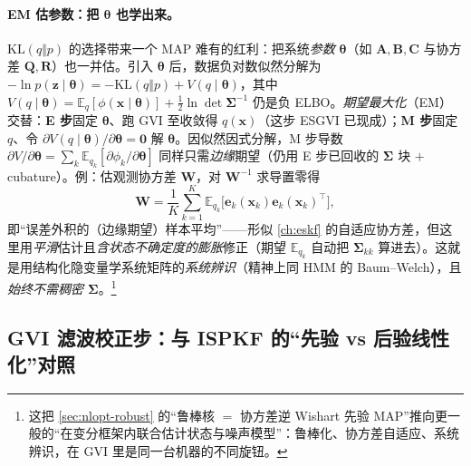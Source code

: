 \paragraph{EM 估参数：把 $\boldsymbol{\theta}$ 也学出来。}
$\mathrm{KL}(q\Vert p)$ 的选择带来一个 MAP 难有的红利：把系统\emph{参数} $\boldsymbol{\theta}$（如 $\mathbf{A},\mathbf{B},\mathbf{C}$ 与协方差 $\mathbf{Q},\mathbf{R}$）也一并估。引入 $\boldsymbol{\theta}$ 后，数据负对数似然分解为 $-\ln p(\mathbf{z}\mid\boldsymbol{\theta})=-\mathrm{KL}(q\Vert p)+V(q\mid\boldsymbol{\theta})$，其中 $V(q\mid\boldsymbol{\theta})=\mathbb{E}_q[\phi(\mathbf{x}\mid\boldsymbol{\theta})]+\tfrac12\ln\det\boldsymbol{\Sigma}^{-1}$ 仍是负 ELBO。\emph{期望最大化}（EM）交替：\textbf{E 步}固定 $\boldsymbol{\theta}$、跑 GVI 至收敛得 $q(\mathbf{x})$（这步 ESGVI 已现成）；\textbf{M 步}固定 $q$、令 $\partial V(q\mid\boldsymbol{\theta})/\partial\boldsymbol{\theta}=\mathbf{0}$ 解 $\boldsymbol{\theta}$。因似然因式分解，M 步导数 $\partial V/\partial\boldsymbol{\theta}=\sum_k\mathbb{E}_{q_k}[\partial\phi_k/\partial\boldsymbol{\theta}]$ 同样只需\emph{边缘}期望（仍用 E 步已回收的 $\boldsymbol{\Sigma}$ 块 $+$ cubature）。例：估观测协方差 $\mathbf{W}$，对 $\mathbf{W}^{-1}$ 求导置零得
\begin{equation}
  \mathbf{W}=\frac1K\sum_{k=1}^{K}\mathbb{E}_{q_k}\!\big[\mathbf{e}_k(\mathbf{x}_k)\mathbf{e}_k(\mathbf{x}_k)^\top\big],
  \label{eq:gvi-em-W}
\end{equation}
即“误差外积的（边缘期望）样本平均”——形似 \cref{ch:eskf} 的自适应协方差，但这里用\emph{平滑}估计且\emph{含状态不确定度的膨胀}修正（期望 $\mathbb{E}_{q_k}$ 自动把 $\boldsymbol{\Sigma}_{kk}$ 算进去）。这就是用结构化隐变量学系统矩阵的\emph{系统辨识}（精神上同 HMM 的 Baum--Welch），且\emph{始终不需稠密 $\boldsymbol{\Sigma}$}。\footnote{这把 \cref{sec:nlopt-robust} 的“鲁棒核 $=$ 协方差逆 Wishart 先验 MAP”推向更一般的“在变分框架内联合估计状态与噪声模型”：鲁棒化、协方差自适应、系统辨识，在 GVI 里是同一台机器的不同旋钮。}

\subsection{GVI 滤波校正步：与 ISPKF 的“先验 vs 后验线性化”对照}
\label{sec:nlopt-gvi-filter}

